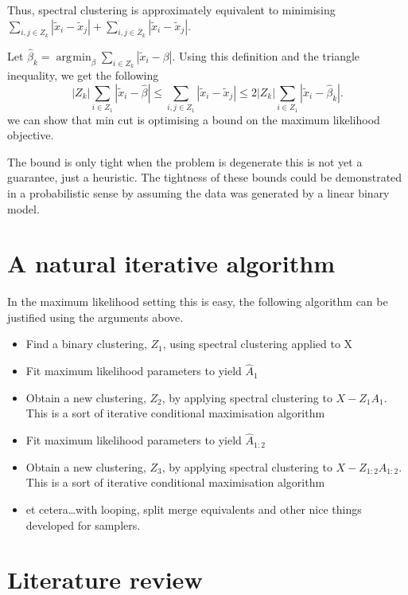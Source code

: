 \documentclass{article}
\numberwithin{equation}{section}
\numberwithin{thm}{section}
\def\IBP{Z}
\def\Weights{A}
\def\Data{X}
\DeclareMathOperator*{\argmin}{\arg\!\min}
\begin{document}
Thus, spectral clustering is approximately equivalent to minimising $\sum_{i,j \in \IBP_k}|\tilde x_i - \tilde x_j| + \sum_{i,j \in \bar\IBP_k}|\tilde x_i - \tilde x_j|$.

Let $\hat\beta_k = \argmin_\beta \sum_{i \in \IBP_k}|\tilde x_i - \beta|$. Using this definition and the triangle inequality, we get the following
\begin{equation}
|\IBP_k|\sum_{i \in \IBP_1}|\tilde x_i - \hat\beta| \leq \sum_{i,j \in \IBP_1}|\tilde x_i - \tilde x_j| \leq 2|\IBP_k|\sum_{i \in \IBP_1}|\tilde x_i - \hat\beta_k|.
\end{equation}
\ie we can show that min cut is optimising a bound on the maximum likelihood objective.

The bound is only tight when the problem is degenerate \ie this is not yet a guarantee, just a heuristic.
The tightness of these bounds could be demonstrated in a probabilistic sense by assuming the data was generated by a linear binary model.

\section{A natural iterative algorithm}

In the maximum likelihood setting this is easy, the following algorithm can be justified using the arguments above.
\begin{itemize}
\item Find a binary clustering, $\IBP_1$, using spectral clustering applied to \Data
\item Fit maximum likelihood parameters to yield $\hat\Weights_1$
\item Obtain a new clustering, $\IBP_2$, by applying spectral clustering to $\Data - \IBP_1\Weights_1$. This is a sort of iterative conditional maximisation algorithm
\item Fit maximum likelihood parameters to yield $\hat\Weights_{1:2}$
\item Obtain a new clustering, $\IBP_{3}$, by applying spectral clustering to $\Data - \IBP_{1:2}\Weights_{1:2}$. This is a sort of iterative conditional maximisation algorithm
\item et cetera\ldots with looping, split merge equivalents and other nice things developed for samplers.
\end{itemize}

\section{Literature review}
\end{document}
